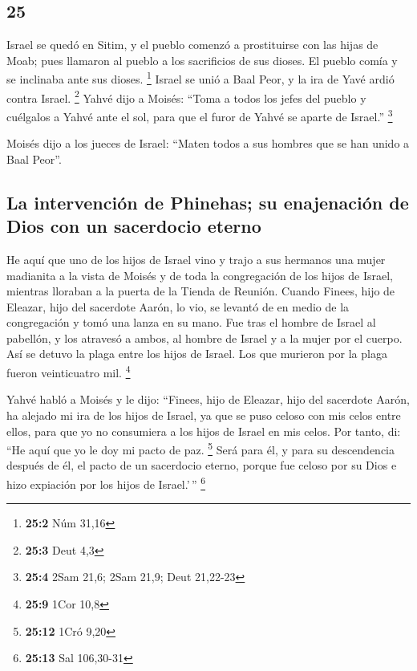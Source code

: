 \begin{paracol}{2}
{\section{25}\label{section-48}}

 Israel se quedó en Sitim, y el pueblo comenzó a
prostituirse con las hijas de Moab;  pues llamaron al
pueblo a los sacrificios de sus dioses. El pueblo comía y se inclinaba
ante sus dioses. \footnote{\textbf{25:2} Núm 31,16} 
Israel se unió a Baal Peor, y la ira de Yavé ardió contra Israel.
\footnote{\textbf{25:3} Deut 4,3}  Yahvé dijo a Moisés:
``Toma a todos los jefes del pueblo y cuélgalos a Yahvé ante el sol,
para que el furor de Yahvé se aparte de Israel.'' \footnote{\textbf{25:4}
  2Sam 21,6; 2Sam 21,9; Deut 21,22-23}

 Moisés dijo a los jueces de Israel: ``Maten todos a sus
hombres que se han unido a Baal Peor''.

\hypertarget{la-intervenciuxf3n-de-phinehas-su-enajenaciuxf3n-de-dios-con-un-sacerdocio-eterno}{%
\subsection{La intervención de Phinehas; su enajenación de Dios con un
sacerdocio
eterno}\label{la-intervenciuxf3n-de-phinehas-su-enajenaciuxf3n-de-dios-con-un-sacerdocio-eterno}}

 He aquí que uno de los hijos de Israel vino y trajo a sus
hermanos una mujer madianita a la vista de Moisés y de toda la
congregación de los hijos de Israel, mientras lloraban a la puerta de la
Tienda de Reunión.  Cuando Finees, hijo de Eleazar, hijo
del sacerdote Aarón, lo vio, se levantó de en medio de la congregación y
tomó una lanza en su mano.  Fue tras el hombre de Israel
al pabellón, y los atravesó a ambos, al hombre de Israel y a la mujer
por el cuerpo. Así se detuvo la plaga entre los hijos de Israel.
 Los que murieron por la plaga fueron veinticuatro mil.
\footnote{\textbf{25:9} 1Cor 10,8}

 Yahvé habló a Moisés y le dijo: 
``Finees, hijo de Eleazar, hijo del sacerdote Aarón, ha alejado mi ira
de los hijos de Israel, ya que se puso celoso con mis celos entre ellos,
para que yo no consumiera a los hijos de Israel en mis celos.
 Por tanto, di: ``He aquí que yo le doy mi pacto de paz.
\footnote{\textbf{25:12} 1Cró 9,20}  Será para él, y para
su descendencia después de él, el pacto de un sacerdocio eterno, porque
fue celoso por su Dios e hizo expiación por los hijos de Israel.'\,''
\footnote{\textbf{25:13} Sal 106,30-31}


\end{paracol}
